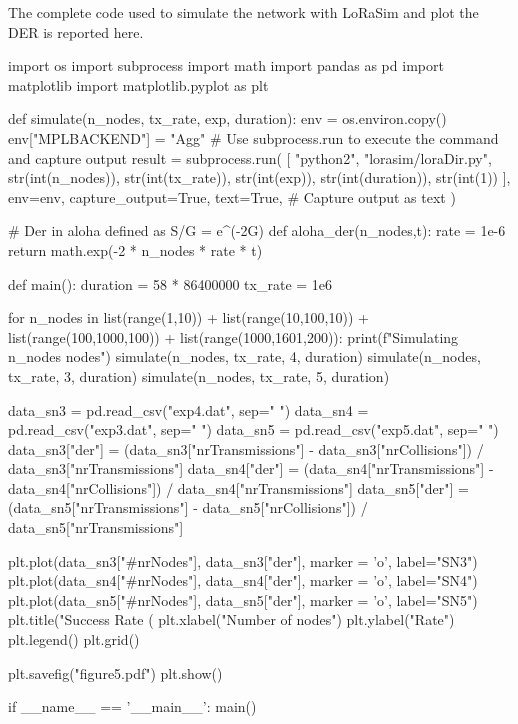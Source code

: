 The complete code used to simulate the network with LoRaSim and plot the DER is reported here.
\begin{python}
import os
import subprocess
import math
import pandas as pd
import matplotlib
import matplotlib.pyplot as plt

def simulate(n_nodes, tx_rate, exp, duration):
    env = os.environ.copy()
    env["MPLBACKEND"] = "Agg"
    # Use subprocess.run to execute the command and capture output
    result = subprocess.run(
        [
            "python2",
            "lorasim/loraDir.py",
            str(int(n_nodes)),
            str(int(tx_rate)),
            str(int(exp)),
            str(int(duration)),
            str(int(1))
        ],
        env=env,
        capture_output=True,
        text=True,  # Capture output as text
    )

# Der in aloha defined as S/G = e^(-2G)
def aloha_der(n_nodes,t):
    rate = 1e-6
    return math.exp(-2 * n_nodes * rate * t)

def main():
    duration = 58 * 86400000
    tx_rate = 1e6

    for n_nodes in list(range(1,10)) + list(range(10,100,10)) + list(range(100,1000,100)) + list(range(1000,1601,200)):
        print(f"Simulating {n_nodes} nodes")
        simulate(n_nodes, tx_rate, 4, duration)
        simulate(n_nodes, tx_rate, 3, duration)
        simulate(n_nodes, tx_rate, 5, duration)

    data_sn3 = pd.read_csv("exp4.dat", sep=" ")
    data_sn4 = pd.read_csv("exp3.dat", sep=" ")
    data_sn5 = pd.read_csv("exp5.dat", sep=" ")
    data_sn3["der"] = (data_sn3["nrTransmissions"] - data_sn3["nrCollisions"]) / data_sn3["nrTransmissions"]
    data_sn4["der"] = (data_sn4["nrTransmissions"] - data_sn4["nrCollisions"]) / data_sn4["nrTransmissions"]
    data_sn5["der"] = (data_sn5["nrTransmissions"] - data_sn5["nrCollisions"]) / data_sn5["nrTransmissions"]
    
    plt.plot(data_sn3["#nrNodes"], data_sn3["der"], marker = 'o', label="SN3")
    plt.plot(data_sn4["#nrNodes"], data_sn4["der"], marker = 'o', label="SN4")
    plt.plot(data_sn5["#nrNodes"], data_sn5["der"], marker = 'o', label="SN5")
    plt.title("Success Rate (%
    plt.xlabel("Number of nodes")
    plt.ylabel("Rate")
    plt.legend()
    plt.grid()

    plt.savefig("figure5.pdf")
    plt.show()

if __name__ == '__main__':
    main()
\end{python}


